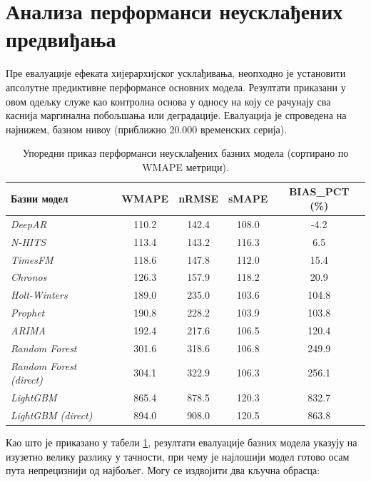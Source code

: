\documentclass[12pt,oneside]{memoir}
\begin{document}
\section{Анализа перформанси неусклађених предвиђања}

Пре евалуације ефеката хијерархијског усклађивања, неопходно је установити апсолутне предиктивне перформансе основних модела. Резултати приказани у овом одељку служе као контролна основа  у односу на коју се рачунају сва каснија маргинална побољшања или деградације. Евалуација је спроведена на најнижем, базном нивоу (приближно 20.000 временских серија).

\begin{table}[htbp]
    \centering
    \caption{Упоредни приказ перформанси неусклађених базних модела (сортирано по WMAPE метрици).}
    \label{tab:base_models}
    \vspace{0.5em}
    \begin{tabular}{l c c c c}
        \toprule
        \textbf{Базни модел} & \textbf{WMAPE} & \textbf{nRMSE} & \textbf{sMAPE} & \textbf{BIAS\_PCT (\%)} \\
        \midrule
        \textit{DeepAR} & 110.2 & 142.4 & 108.0 & -4.2 \\
        \textit{N-HITS} & 113.4 & 143.2 & 116.3 & 6.5 \\
        \textit{TimesFM} & 118.6 & 147.8 & 112.0 & 15.4 \\
        \textit{Chronos} & 126.3 & 157.9 & 118.2 & 20.9 \\
        \textit{Holt-Winters} & 189.0 & 235.0 & 103.6 & 104.8 \\
        \textit{Prophet} & 190.8 & 228.2 & 103.9 & 103.8 \\
        \textit{ARIMA} & 192.4 & 217.6 & 106.5 & 120.4 \\
        \textit{Random Forest} & 301.6 & 318.6 & 106.8 & 249.9 \\
        \textit{Random Forest (direct)} & 304.1 & 322.9 & 106.3 & 256.1 \\
        \textit{LightGBM} & 865.4 & 878.5 & 120.3 & 832.7 \\
        \textit{LightGBM (direct)} & 894.0 & 908.0 & 120.5 & 863.8 \\
        \bottomrule
    \end{tabular}
\end{table}

Као што је приказано у табели \ref{tab:base_models}, резултати евалуације базних модела указују на изузетно велику разлику у тачности, при чему је најлошији модел готово осам пута непрецизнији од најбољег. Могу се издвојити два кључна обрасца:
\end{document}
